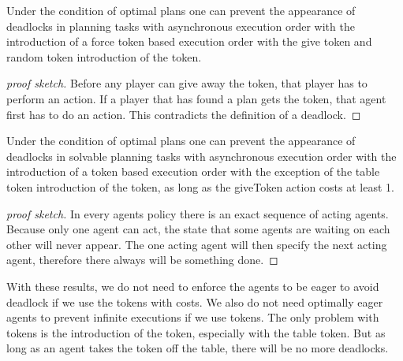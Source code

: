 \begin{theorem}
Under the condition of optimal plans one can prevent the appearance of deadlocks in planning tasks with asynchronous execution order with the introduction of a force token based execution order with the give token and random token introduction of the token.
\end{theorem}

\begin{proof}[proof sketch]
  Before any player can give away the token, that player has to perform an action. If a player that has found a plan gets the token, that agent first has to do an action. This contradicts the definition of a deadlock.
\end{proof}


\begin{theorem}
  Under the condition of optimal plans one can prevent the appearance of deadlocks in solvable planning tasks with asynchronous execution order with the introduction of a token based execution order with the exception of the table token introduction of the token, as long as the giveToken action costs at least 1.
\end{theorem}

\begin{proof}[proof sketch]
  In every agents policy there is an exact sequence of acting agents. Because only one agent can act, the state that some agents are waiting on each other will never appear.
  The one acting agent will then specify the next acting agent, therefore there always will be something done.
\end{proof}


With these results, we do not need to enforce the agents to be eager to avoid deadlock if we use the tokens with costs. We also do not need optimally eager agents to prevent infinite executions if we use tokens. The only problem with tokens is the introduction of the token, especially with the table token. But as long as an agent takes the token off the table, there will be no more deadlocks.
